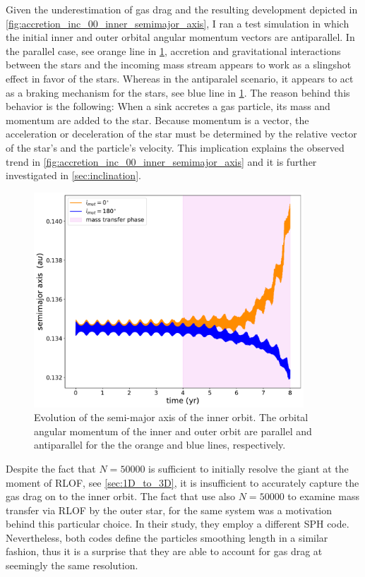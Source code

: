 Given the underestimation of gas drag and the resulting development depicted in \cref{fig:accretion_inc_00_inner_semimajor_axis}, I ran a test simulation in which the initial inner and outer orbital angular momentum vectors are antiparallel. In the parallel case, see orange line in \cref{fig:retro}, accretion and gravitational interactions between the stars and the incoming mass stream appears to work as a slingshot effect in favor of the stars. Whereas in the antiparalel scenario, it appears to act as a braking mechanism for the stars, see blue line in \cref{fig:retro}. The reason behind this behavior is the following: When a sink accretes a gas particle, its mass and momentum are added to the star. Because momentum is a vector, the acceleration or deceleration of the star must be determined by the relative vector of the star's and the particle's velocity. This implication explains the observed trend in \cref{fig:accretion_inc_00_inner_semimajor_axis} and it is further investigated in \cref{sec:inclination}.
\begin{figure}[!htb]
    \centering
    \includegraphics[width=0.9\textwidth]{Thesis/graphs/accretion_inc_00_retro_inner_semimajor_axis.pdf}
    \caption{Evolution of the semi-major axis of the inner orbit. The orbital angular momentum of the inner and outer orbit are parallel and antiparallel for the the orange and blue lines, respectively.}
    \label{fig:retro}
\end{figure}

Despite the fact that $N=50000$ is sufficient to initially resolve the giant at the moment of RLOF, see \cref{sec:1D_to_3D}, it is insufficient to accurately capture the gas drag on to the inner orbit. The fact that \cite{de2014evolution} use also $N=50000$ to examine mass transfer via RLOF by the outer star, for the same system was a motivation behind this particular choice. In their study, they employ a different SPH code. Nevertheless, both codes define the particles smoothing length in a similar fashion, thus it is a surprise that they are able to account for gas drag at seemingly the same resolution. 


